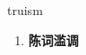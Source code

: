 
\begin{frame}
{\huge truism}
\begin{center}
\begin{enumerate}\Large
  \item \textbf{陈词滥调}
\end{enumerate}
\end{center}
\end{frame}
